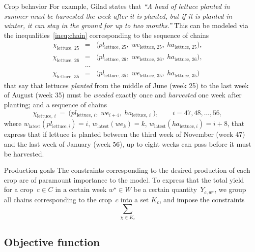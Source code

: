 \documentclass[11pt,reqno]{amsart}
\numberwithin{equation}{section}
\begin{document}
\begin{mydesc}
\item[Crop behavior] For example, Gilad states that \emph{``A head of lettuce planted in
  summer must be harvested the week after it is planted, but if it is planted in winter,
  it can stay in the ground for up to two months.''} This can be modeled via the
  inequalities~\eqref{ineq:chain} corresponding to the sequence of chains
\begin{eqnarray*}
   \chi_{\text{lettuce},\, 25} 
   &=& 
   \big(
      pl_{\text{lettuce},\, 25}, \; 
      we_{\text{lettuce},\, 25}, \;
      ha_{\text{lettuce},\, 25}
      \big), \\
   \chi_{\text{lettuce},\, 26} 
   &=& 
   \big(
      pl_{\text{lettuce},\, 26}, \; 
      we_{\text{lettuce},\, 26}, \;
      ha_{\text{lettuce},\, 26}
      \big), \\
   &\dots& \\
   \chi_{\text{lettuce},\, 35} 
   &=& 
   \big(
      pl_{\text{lettuce},\, 35}, \; 
      we_{\text{lettuce},\, 35}, \;
      ha_{\text{lettuce},\, 35}
      \big)
\end{eqnarray*}
that say that lettuces \emph{planted} from the middle of June (week 25) to the last week
of August (week 35) must be \emph{weeded} exactly once and \emph{harvested} one week after
planting; and a sequence of chains
\[
    \chi_{\text{lettuce},\, i} 
   \ = \ 
   \big(
      pl_{\text{lettuce},\, i}, \; 
      we_{i+4}, \;
      ha_{\text{lettuce},\, i} \;
      \big),
      \qquad i=47,48,\dots, 56,
\]
where $w_{\text{latest}}(pl_{\text{lettuce},i})=i$, $w_{\text{latest}}(we_k)=k$,
$w_{\text{latest}}(ha_{\text{lettuce},i})=i+8$, that express that if lettuce is planted
between the third week of November (week 47) and the last week of January (week 56), up to
eight weeks can pass before it must be harvested.

\item[Production goals] The constraints corresponding to the desired production of each
  crop are of paramount importance to the model. To express that the total yield for a
  crop~$c\in C$ in a certain week $w^\star\in W$ be a certain quantity~$Y_{c,w^\star}$, we
  group all chains corresponding to the crop~$c$ into a set $K_c$, and impose the
  constraints
  \[
     \sum_{\chi\in K_c} 
  \]
\end{mydesc}

\subsection{Objective function}
\end{document}

